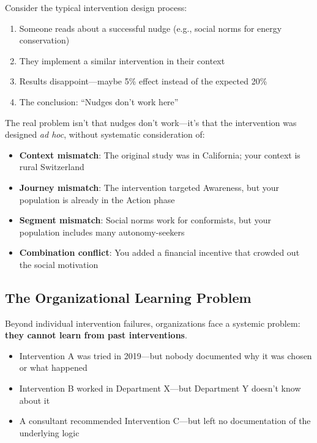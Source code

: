 Consider the typical intervention design process:

\begin{enumerate}
\item Someone reads about a successful nudge (e.g., social norms for energy conservation)
\item They implement a similar intervention in their context
\item Results disappoint---maybe 5\% effect instead of the expected 20\%
\item The conclusion: ``Nudges don't work here''
\end{enumerate}

The real problem isn't that nudges don't work---it's that the intervention was designed \textit{ad hoc}, without systematic consideration of:

\begin{itemize}
\item \textbf{Context mismatch}: The original study was in California; your context is rural Switzerland
\item \textbf{Journey mismatch}: The intervention targeted Awareness, but your population is already in the Action phase
\item \textbf{Segment mismatch}: Social norms work for conformists, but your population includes many autonomy-seekers
\item \textbf{Combination conflict}: You added a financial incentive that crowded out the social motivation
\end{itemize}

\subsection{The Organizational Learning Problem}

Beyond individual intervention failures, organizations face a systemic problem: \textbf{they cannot learn from past interventions}.

\begin{itemize}
\item Intervention A was tried in 2019---but nobody documented why it was chosen or what happened
\item Intervention B worked in Department X---but Department Y doesn't know about it
\item A consultant recommended Intervention C---but left no documentation of the underlying logic
\end{itemize}

